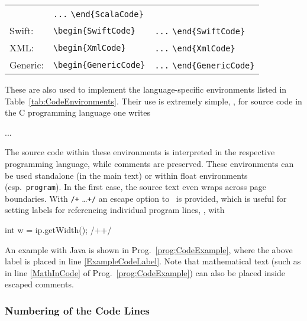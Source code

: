 \begin{table}
\begin{tabular}{@{}lll@{}}
        & \verb!...! \verb!\end{ScalaCode}! \\
        Swift: & \verb!\begin{SwiftCode}!
        & \verb!...! \verb!\end{SwiftCode}! \\
        XML: & \verb!\begin{XmlCode}!
        & \verb!...! \verb!\end{XmlCode}! \\
        Generic: & \verb!\begin{GenericCode}!
        & \verb!...! \verb!\end{GenericCode}! \\
        \bottomrule
    \end{tabular}
\end{table}

These are also used to implement the language-specific environments listed in
Table~\ref{tab:CodeEnvironments}. Their use is extremely simple, \eg, for
source code in the C programming language one writes
%
\begin{GenericCode}[numbers=none]
\begin{CCode}
    ... 
\end{CCode}
\end{GenericCode}
%
The source code within these environments is interpreted in the respective
programming language, while comments are preserved. These environments can be
used standalone (in the main text) or within float environments (esp.\
\texttt{program}). In the first case, the source text even wraps across page
boundaries. With \verb!/+! \ldots \verb!+/! an escape option to \latex\ is
provided, which is useful for setting labels for referencing individual
program lines, \eg, with
%
\begin{GenericCode}[numbers=none]
int w = ip.getWidth(); /+\label{ExampleCodeLabel}+/
\end{GenericCode}
%
An example with Java is shown in Prog.~\ref{prog:CodeExample}, where the
above label is placed in line \ref{ExampleCodeLabel}. Note that mathematical
text (such as in line \ref{MathInCode} of Prog.~\ref{prog:CodeExample}) can
also be placed inside escaped comments.


\subsubsection{Numbering of the Code Lines}

